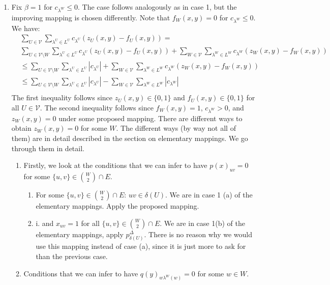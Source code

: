\begin{enumerate}
  
    \item Fix $\beta=1$ for $c_{\lambda^W}\leq 0$. The case follows analogously as in case 1, but the improving mapping is chosen differently. 
    Note that $f_W(x,y)=0$ for $c_{\lambda^W} \leq 0$. 
    We have: 
    \begin{align*}
        & \sum_{U \in \mathcal{V}} \sum_{\lambda^U \in L^U} c_{\lambda^U} (z_U(x,y)- f_U(x,y)) = \\
       &  \sum_{U \in \mathcal{V} \setminus W} \sum_{\lambda^U \in L^U} c_{\lambda^U} (z_U(x,y)- f_U(x,y))  +  \sum_{W \in \mathcal{V}} \sum_{\lambda^W \in L^W} c_{\lambda^W} (z_W(x,y)- f_W(x,y))  \\
       & \leq \sum_{U \in \mathcal{V} \setminus W} \sum_{\lambda^U \in L^U} |c_{\lambda^U}| +  \sum_{W \in \mathcal{V}} \sum_{\lambda^W \in L^W} c_{\lambda^W} (z_W(x,y)- f_W(x,y)) \\
       & \leq \sum_{U \in \mathcal{V} \setminus W} \sum_{\lambda^U \in L^U} |c_{\lambda^U}| -\sum_{W \in \mathcal{V}} \sum_{\lambda^W \in L^W} |c_{\lambda^W}| \\
    \end{align*}
    The first inequality follows since $z_U(x,y) \in \{0,1\}$ and $f_U(x,y) \in \{0,1\}$ for all $U \in \mathcal{V}$. 
    The second inequality follows since $f_W(x,y)=1$, $c_{\lambda^W}>0$, and $z_W(x,y)=0$ under some proposed mapping. 
    There are different ways to obtain $z_W(x,y)=0$ for some $W$. The different ways (by way not all of them) are in detail described in the section on elementary mappings. We go through them in detail. 
    \begin{enumerate}
        \item Firstly, we look at the conditions that we can infer to have $p(x)_{uv}=0$ for some $\{u,v \} \in \binom{W}{2} \cap E$. 
        \begin{enumerate}
            \item For some $\{u,v \} \in \binom{W}{2} \cap E$: $uv \in \delta(U)$. We are in case 1 (a) of the elementary mappings. Apply the proposed mapping.  
            \item i. and $x_{uv}=1$ for all $\{u,v \} \in \binom{W}{2} \cap E$. We are in case 1(b) of the elementary mappings, apply $p^{\Delta}_{\delta(U)}$. There is no reason why we would use this mapping instead of case (a), since it is just more to ask for than the previous case. 
        \end{enumerate}
        \item Conditions that we can infer to have $q(y)_{w\lambda^W(w)}=0$ for some $w \in W$. 

\end{enumerate}
\end{enumerate}
